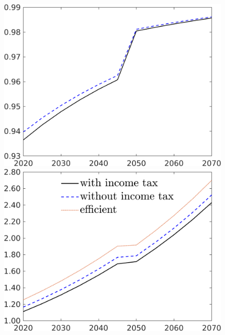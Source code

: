 \begin{figure}[h!!]
\begin{minipage}[]{0.32\textwidth}
		\includegraphics[width=1\textwidth]{../../codding_model/own_basedOnFried/optimalPol_190722_tidiedUp/figures/all_10Aout22/comp_benchregime3_notaul2_OPT_T_NoTaus_tauf_spillover0_noskill1_sep1_xgrowth1_PV1_etaa0.79_lgd0.png}
	\end{minipage}
	\begin{minipage}[]{0.32\textwidth}
		\includegraphics[width=1\textwidth]{../../codding_model/own_basedOnFried/optimalPol_190722_tidiedUp/figures/all_10Aout22/C_CompEffOPT_T_NoTaus_benchregime3_pol2_spillover0_noskill1_sep1_xgrowth1_PV1_etaa0.79_lgd1_lff0.png}
	\end{minipage}

\end{figure}

